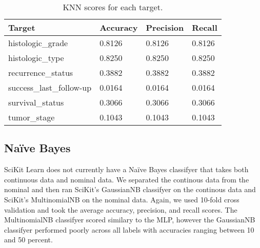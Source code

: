 \documentclass{article}
\begin{document}
\medskip
\begin{table}[H]
\begin{center}
\begin{tabular}{ *{4}{l} }
    \multicolumn{1}{p{1.5cm}}{\raggedright Target} &  
    \multicolumn{1}{p{1.5cm}}{\raggedright Accuracy} &  
    \multicolumn{1}{p{1.5cm}}{\raggedright Precision} &  
    \multicolumn{1}{p{1.5cm}}{\raggedright Recall} \\ \hline
histologic\_grade       &              0.8126 &               0.8126 &            0.8126 \\
histologic\_type        &              0.8250 &               0.8250 &            0.8250 \\
recurrence\_status      &              0.3882 &               0.3882 &            0.3882 \\
success\_last\_follow-up &              0.0164 &               0.0164 &            0.0164 \\
survival\_status        &              0.3066 &               0.3066 &            0.3066 \\
tumor\_stage            &              0.1043 &               0.1043 &            0.1043 \\
\end{tabular}
\caption{KNN scores for each target.}
\end{center}
\end{table}

\subsection{Naïve Bayes}
SciKit Learn does not currently have a Naïve Bayes classifyer that takes both continuous data and nominal data. We separated the continous data from the nominal and then ran SciKit's GaussianNB classifyer on the continous data and SciKit's MultinomialNB on the nominal data. Again, we used 10-fold cross validation and took the average accuracy, precision, and recall scores. The MultinomialNB classifyer scored similary to the MLP, however the GaussianNB classifyer performed poorly across all labels with accuracies ranging between 10 and 50 percent.
\end{document}
